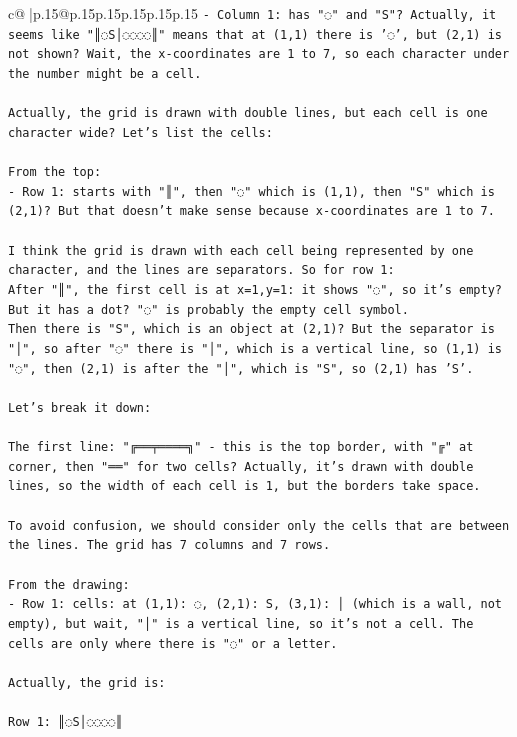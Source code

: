 \documentclass{article}
\begin{document}
{\begin{supertabular}{c@{$\;$}|p{.15\linewidth}@{}p{.15\linewidth}p{.15\linewidth}p{.15\linewidth}p{.15\linewidth}p{.15\linewidth}}
{{{\texttt{{-} Column 1: has "◌" and "S"? Actually, it seems like "║◌S│◌◌◌◌║" means that at (1,1) there is '◌', but (2,1) is not shown? Wait, the x{-}coordinates are 1 to 7, so each character under the number might be a cell.} \\
\\ 
\texttt{Actually, the grid is drawn with double lines, but each cell is one character wide? Let's list the cells:} \\
\\ 
\texttt{From the top:} \\
\texttt{{-} Row 1: starts with "║", then "◌" which is (1,1), then "S" which is (2,1)? But that doesn't make sense because x{-}coordinates are 1 to 7.} \\
\\ 
\texttt{I think the grid is drawn with each cell being represented by one character, and the lines are separators. So for row 1:} \\
\texttt{After "║", the first cell is at x=1,y=1: it shows "◌", so it's empty? But it has a dot? "◌" is probably the empty cell symbol.} \\
\texttt{Then there is "S", which is an object at (2,1)? But the separator is "│", so after "◌" there is "│", which is a vertical line, so (1,1) is "◌", then (2,1) is after the "│", which is "S", so (2,1) has 'S'.} \\
\\ 
\texttt{Let's break it down:} \\
\\ 
\texttt{The first line: "╔══╤════╗" {-} this is the top border, with "╔" at corner, then "══" for two cells? Actually, it's drawn with double lines, so the width of each cell is 1, but the borders take space.} \\
\\ 
\texttt{To avoid confusion, we should consider only the cells that are between the lines. The grid has 7 columns and 7 rows.} \\
\\ 
\texttt{From the drawing:} \\
\texttt{{-} Row 1: cells: at (1,1): ◌, (2,1): S, (3,1): │ (which is a wall, not empty), but wait, "│" is a vertical line, so it's not a cell. The cells are only where there is "◌" or a letter.} \\
\\ 
\texttt{Actually, the grid is:} \\
\\ 
\texttt{Row 1: ║◌S│◌◌◌◌║} \\
}}}
\end{supertabular}}
\end{document}
